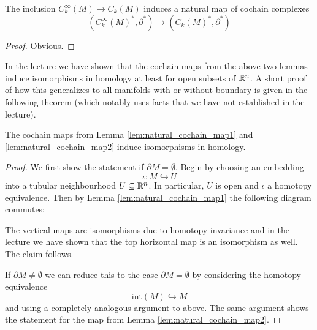         \begin{lemma}
            \label{lem:natural_cochain_map2}
            The inclusion $C_k^\infty(M) \to C_k(M)$ induces a natural map of cochain complexes
            \[
                (C_k^\infty(M)^\ast,\partial^\ast) \to (C_k(M)^\ast,\partial^\ast)
            \]
        \end{lemma}
        \begin{proof}
            Obvious.
        \end{proof}

        In the lecture we have shown that the cochain maps from the above two lemmas induce isomorphisms in homology at least for open subsets of $\mathbb{R}^n$. A short proof of how this generalizes to all manifolds with or without boundary is given in the following theorem (which notably uses facts that we have not established in the lecture).

        \begin{theorem}
            The cochain maps from Lemma \ref{lem:natural_cochain_map1} and \ref{lem:natural_cochain_map2} induce isomorphisms in homology.
        \end{theorem}
        \begin{proof}
            We first show the statement if $\partial M = \emptyset$. Begin by choosing an embedding
            \[
            \iota \colon M \hookrightarrow U
            \]
            into a tubular neighbourhood $U \subseteq \mathbb{R}^n$. In particular, $U$ is open and $\iota$ a homotopy equivalence. Then by Lemma \ref{lem:natural_cochain_map1} the following diagram commutes:
            \begin{center}
            \end{center}
            The vertical maps are isomorphisms due to homotopy invariance and in the lecture we have shown that the top horizontal map is an isomorphism as well. The claim follows. 
            
            If $\partial M \neq \emptyset$ we can reduce this to the case $\partial M = \emptyset$ by considering the homotopy equivalence
            \[
            \mathrm{int}(M) \hookrightarrow M
            \]
            and using a completely analogous argument to above. The same argument shows the statement for the map from Lemma \ref{lem:natural_cochain_map2}.
        \end{proof}

